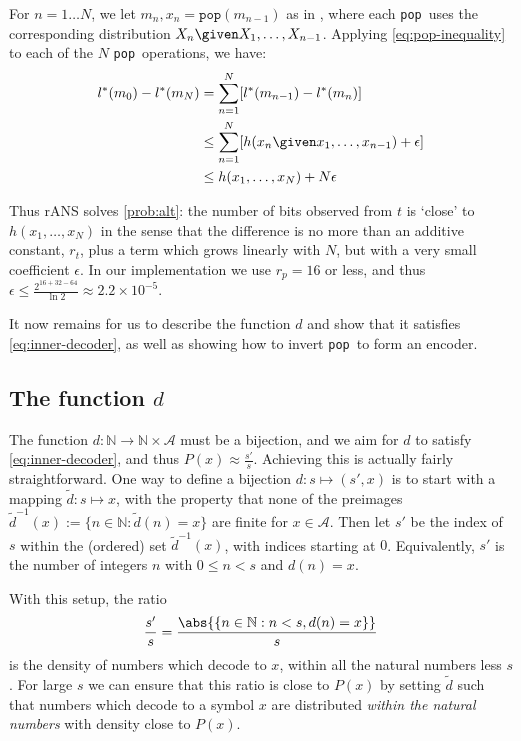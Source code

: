 \documentclass{article}
\theoremstyle{definition}
\newcommand{\pop}{\texttt{pop}}
\begin{document}
  For \(n=1\ldots N\), we let \(m_n, x_n = \pop(m_{n-1})\) as in
  , where each \pop\ uses the corresponding distribution
  \(X_n \given X_1, \ldots, X_{n-1}\). Applying \cref{eq:pop-inequality} to
  each of the \(N\) \pop\ operations, we have:
  \begin{align}
    l^*(m_0) - l^*(m_N)
      &= \sum_{n=1}^N [l^*(m_{n-1}) - l^*(m_n)]\\
      &\leq \sum_{n=1}^N [h(x_n \given x_1, \ldots, x_{n-1}) + \epsilon]\\
      &\leq h(x_1, \ldots, x_N) + N\epsilon
  \end{align}

  Thus rANS solves \cref{prob:alt}: the number of bits observed from \(t\) is
  `close' to \(h(x_1,\ldots,x_N)\) in the sense that the difference is no more
  than an additive constant, \(r_t\), plus a term which grows linearly with
  \(N\), but with a very small coefficient \(\epsilon\). In our implementation
  we use \(r_p = 16\) or less, and thus \(\epsilon \leq \frac{2^{16 + 32 -
  64}}{\ln 2} \approx 2.2\times 10^{-5}\).

  It now remains for us to describe the function \(d\) and show that it
  satisfies \cref{eq:inner-decoder}, as well as showing how to invert \pop\ to
  form an encoder.


\subsection{The function \(d\)}
The function \(d:\mathbb{N}\rightarrow\mathbb{N}\times\mathcal{A}\) must be a
bijection, and we aim for \(d\) to satisfy \cref{eq:inner-decoder}, and thus
\(P(x)\approx \frac{s'}{s}\).  Achieving this is actually fairly
straightforward.  One way to define a bijection \(d:s\mapsto(s', x)\) is to
start with a mapping \(\tilde d: s\mapsto x\), with the property that none of
the preimages \(\tilde d^{-1}(x):=\{n\in\mathbb{N}:\tilde d(n) = x\}\) are
finite for \(x\in\mathcal{A}\). Then let \(s'\) be the index of \(s\) within
the (ordered) set \(\tilde d^{-1}(x)\), with indices starting at \(0\).
Equivalently, \(s'\) is the number of integers \(n\) with \(0\leq n<s\) and
\(d(n) = x\).

With this setup, the ratio
\begin{equation}\label{eq:ratio}
  \frac{s'}{s} = \frac{\abs{\{n\in\mathbb{N}: n < s, d(n) = x\}}}{s}
\end{equation}
is the density of numbers which decode to \(x\), within all the natural numbers
less \(s\). For large \(s\) we can ensure that this ratio is close to \(P(x)\)
by setting \(\tilde d\) such that numbers which decode to a symbol \(x\) are
distributed \emph{within the natural numbers} with density close to \(P(x)\).
\end{document}
